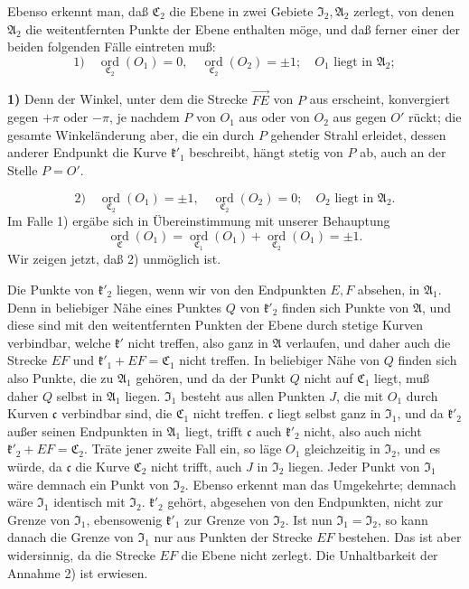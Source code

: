 \documentclass{article}
\begin{document}
Ebenso erkennt man, daß $\mathfrak{C}_2$ die Ebene in zwei Gebiete $\mathfrak{I}_2, \mathfrak{A}_2$ zerlegt, von denen $\mathfrak{A}_2$ die weitentfernten Punkte der Ebene enthalten möge, und daß ferner einer der beiden folgenden Fälle eintreten muß:
\[ 1) \quad \underset{\mathfrak{C}_2}{\operatorname{ord}} (O_1) = 0, \quad \underset{\mathfrak{C}_2}{\operatorname{ord}} (O_2) = \pm 1; \quad O_1 \text{ liegt in } \mathfrak{A}_2; \]

\textbf{1)} Denn der Winkel, unter dem die Strecke $\overrightarrow{FE}$ von $P$ aus erscheint, konvergiert gegen $+\pi$ oder $-\pi$, je nachdem $P$ von $O_1$ aus oder von $O_2$ aus gegen $O'$ rückt; die gesamte Winkeländerung aber, die ein durch $P$ gehender Strahl erleidet, dessen anderer Endpunkt die Kurve $\mathfrak{k}'_1$ beschreibt, hängt stetig von $P$ ab, auch an der Stelle $P = O'$.

\[ 2) \quad \underset{\mathfrak{C}_2}{\operatorname{ord}} (O_1) = \pm 1, \quad \underset{\mathfrak{C}_2}{\operatorname{ord}} (O_2) = 0; \quad O_2 \text{ liegt in } \mathfrak{A}_2. \]
Im Falle 1) ergäbe sich in Übereinstimmung mit unserer Behauptung
\[ \underset{\mathfrak{C}}{\operatorname{ord}} (O_1) = \underset{\mathfrak{C}_1}{\operatorname{ord}} (O_1) + \underset{\mathfrak{C}_2}{\operatorname{ord}} (O_1) = \pm 1. \]
Wir zeigen jetzt, daß 2) unmöglich ist.

Die Punkte von $\mathfrak{k}'_2$ liegen, wenn wir von den Endpunkten $E, F$ absehen, in $\mathfrak{A}_1$. Denn in beliebiger Nähe eines Punktes $Q$ von $\mathfrak{k}'_2$ finden sich Punkte von $\mathfrak{A}$, und diese sind mit den weitentfernten Punkten der Ebene durch stetige Kurven verbindbar, welche $\mathfrak{k}'$ nicht treffen, also ganz in $\mathfrak{A}$ verlaufen, und daher auch die Strecke $EF$ und $\mathfrak{k}'_1 + EF = \mathfrak{C}_1$ nicht treffen. In beliebiger Nähe von $Q$ finden sich also Punkte, die zu $\mathfrak{A}_1$ gehören, und da der Punkt $Q$ nicht auf $\mathfrak{C}_1$ liegt, muß daher $Q$ selbst in $\mathfrak{A}_1$ liegen. $\mathfrak{I}_1$ besteht aus allen Punkten $J$, die mit $O_1$ durch Kurven $\mathfrak{c}$ verbindbar sind, die $\mathfrak{C}_1$ nicht treffen. $\mathfrak{c}$ liegt selbst ganz in $\mathfrak{I}_1$, und da $\mathfrak{k}'_2$ außer seinen Endpunkten in $\mathfrak{A}_1$ liegt, trifft $\mathfrak{c}$ auch $\mathfrak{k}'_2$ nicht, also auch nicht $\mathfrak{k}'_2 + EF = \mathfrak{C}_2$. Träte jener zweite Fall ein, so läge $O_1$ gleichzeitig in $\mathfrak{I}_2$, und es würde, da $\mathfrak{c}$ die Kurve $\mathfrak{C}_2$ nicht trifft, auch $J$ in $\mathfrak{I}_2$ liegen. Jeder Punkt von $\mathfrak{I}_1$ wäre demnach ein Punkt von $\mathfrak{I}_2$. Ebenso erkennt man das Umgekehrte; demnach wäre $\mathfrak{I}_1$ identisch mit $\mathfrak{I}_2$. $\mathfrak{k}'_2$ gehört, abgesehen von den Endpunkten, nicht zur Grenze von $\mathfrak{I}_1$, ebensowenig $\mathfrak{k}'_1$ zur Grenze von $\mathfrak{I}_2$. Ist nun $\mathfrak{I}_1 = \mathfrak{I}_2$, so kann danach die Grenze von $\mathfrak{I}_1$ nur aus Punkten der Strecke $EF$ bestehen. Das ist aber widersinnig, da die Strecke $EF$ die Ebene nicht zerlegt. Die Unhaltbarkeit der Annahme 2) ist erwiesen.
\end{document}
